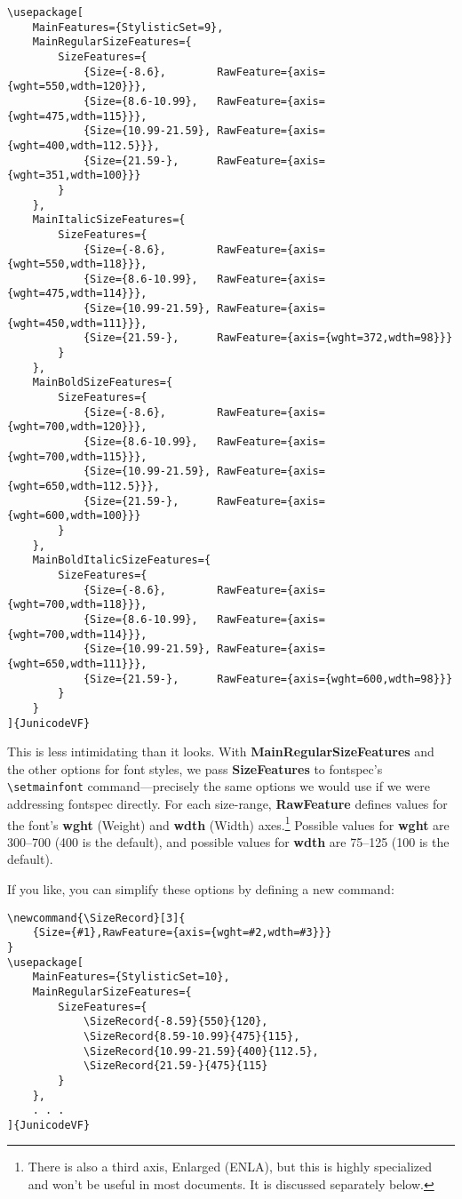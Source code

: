 \documentclass[12pt]{article}
\newcommand{\SizeRecord}[3]{{Size={#1},RawFeature={axis={wght=#2,wdth=#3}}}}
\begin{document}
\footnotesize
\begin{verbatim}
\usepackage[
    MainFeatures={StylisticSet=9},
    MainRegularSizeFeatures={
        SizeFeatures={
            {Size={-8.6},        RawFeature={axis={wght=550,wdth=120}}},
            {Size={8.6-10.99},   RawFeature={axis={wght=475,wdth=115}}},
            {Size={10.99-21.59}, RawFeature={axis={wght=400,wdth=112.5}}},
            {Size={21.59-},      RawFeature={axis={wght=351,wdth=100}}}
        }
    },
    MainItalicSizeFeatures={
        SizeFeatures={
            {Size={-8.6},        RawFeature={axis={wght=550,wdth=118}}},
            {Size={8.6-10.99},   RawFeature={axis={wght=475,wdth=114}}},
            {Size={10.99-21.59}, RawFeature={axis={wght=450,wdth=111}}},
            {Size={21.59-},      RawFeature={axis={wght=372,wdth=98}}}
        }
    },
    MainBoldSizeFeatures={
        SizeFeatures={
            {Size={-8.6},        RawFeature={axis={wght=700,wdth=120}}},
            {Size={8.6-10.99},   RawFeature={axis={wght=700,wdth=115}}},
            {Size={10.99-21.59}, RawFeature={axis={wght=650,wdth=112.5}}},
            {Size={21.59-},      RawFeature={axis={wght=600,wdth=100}}}
        }
    },
    MainBoldItalicSizeFeatures={
        SizeFeatures={
            {Size={-8.6},        RawFeature={axis={wght=700,wdth=118}}},
            {Size={8.6-10.99},   RawFeature={axis={wght=700,wdth=114}}},
            {Size={10.99-21.59}, RawFeature={axis={wght=650,wdth=111}}},
            {Size={21.59-},      RawFeature={axis={wght=600,wdth=98}}}
        }
    }
]{JunicodeVF}
\end{verbatim}
\normalsize

\noindent This is less intimidating than it looks. With
\textbf{MainRegularSizeFeatures} and the other options for font styles, we pass \textbf{SizeFeatures}
to fontspec’s {\small\verb|\setmainfont|} command---precisely the same options
we would use if we were addressing fontspec directly.
For each size-range, \textbf{RawFeature} defines values for the font’s \textbf{wght} (Weight)
and \textbf{wdth} (Width) axes.\footnote{There is also a third axis, Enlarged (ENLA),
but this is highly specialized and won't be useful in most documents. It is
discussed separately below.} Possible values for \textbf{wght} are
300–700 (400 is the default), and possible values for \textbf{wdth} are 75–125
(100 is the default).

If you like, you can simplify these options by defining a new command:

\footnotesize
\begin{verbatim}
\newcommand{\SizeRecord}[3]{
    {Size={#1},RawFeature={axis={wght=#2,wdth=#3}}}
}
\usepackage[
    MainFeatures={StylisticSet=10},
    MainRegularSizeFeatures={
        SizeFeatures={
            \SizeRecord{-8.59}{550}{120},
            \SizeRecord{8.59-10.99}{475}{115},
            \SizeRecord{10.99-21.59}{400}{112.5},
            \SizeRecord{21.59-}{475}{115}
        }
    },
    . . .
]{JunicodeVF}
\end{verbatim}
\normalsize
\end{document}
